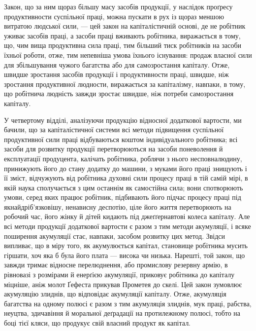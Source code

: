 
Закон, що за ним щораз більшу масу засобів продукції, у
наслідок проґресу продуктивности суспільної праці, можна пускати
в рух із щораз меншою витратою людської сили, — цей
закон на капіталістичній основі, де не робітник уживає засобів
праці, а засоби праці вживають робітника, виражається в тому,
що, чим вища продуктивна сила праці, тим більший тиск робітників
на засоби їхньої роботи, отже, тим непевніша умова їхнього
існування: продаж власної сили для збільшування чужого багатства
або для самозростання капіталу. Отже, швидше зростання
засобів продукції і продуктивности праці, швидше, ніж
зростання продуктивної людности, виражається за капіталізму,
навпаки, в тому, що робітнича людність завжди зростає швидше,
ніж потреби самозростання капіталу.

У четвертому відділі, аналізуючи продукцію відносної додаткової
вартости, ми бачили, що за капіталістичної системи всі
методи підвищення суспільної продуктивної сили праці відбуваються
коштом індивідуального робітника; всі засоби для розвитку
продукції перетворюються на засоби поневолення й експлуатації
продуцента, калічать робітника, роблячи з нього несповналюдину,
принижують його до стану додатку до машини, з муками
його праці знищують і її зміст, відчужують від робітника духовні
сили процесу праці в тій самій мірі, в якій наука сполучається
з цим останнім як самостійна сила; вони спотворюють умови, серед
яких працює робітник, підбивають його підчас процесу праці
під якнайдріб’язковішу, ненависну деспотію, ціле його життя
перетворюють на робочий час, його жінку й дітей кидають під
джеґґернавтові колеса капіталу. Але всі методи продукції додаткової
вартости є разом з тим методи акумуляції, і всяке поширення
акумуляції стає, навпаки, засобом розвитку цих метод.
Звідси випливає, що в міру того, як акумулюється капітал,
становище робітника мусить гіршати, хоч яка б була його плата —
висока чи низька. Нарешті, той закон, що завжди тримає відносне
перелюднення, або промислову резервну армію, в рівновазі
з розмірами й енерґією акумуляції, приковує робітника до капіталу
міцніше, аніж молот Ґефеста прикував Прометея до скелі.
Цей закон зумовлює акумуляцію злиднів, що відповідає акумуляції
капіталу. Отже, акумуляція багатства на одному полюсі
є разом з тим акумуляція злиднів, мук праці, рабства, неуцтва,
здичавіння й моральної деґрадації на протилежному полюсі,
тобто на боці тієї кляси, що продукує свій власний продукт як
капітал.

